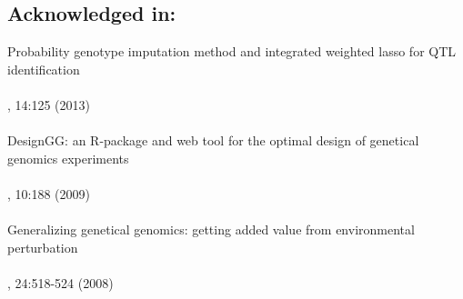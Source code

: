 \subsection*{Acknowledged in:}
  Probability genotype imputation method and integrated weighted lasso for QTL identification\\
  \\
  , 14:125 (2013)\\\\   
  DesignGG: an R-package and web tool for the optimal design of genetical genomics experiments\\
  \\
  , 10:188 (2009)\\\\
  Generalizing genetical genomics: getting added value from environmental perturbation\\
  \\
  , 24:518-524 (2008)

